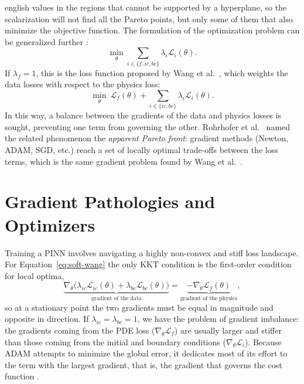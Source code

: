\documentclass[12pt,letterpaper,twoside]{book}
\newcommand{\Loss}{\mathcal{L}}
\begin{document}
\begin{hyphenrules}{english}
values in the regions that cannot be supported by a hyperplane, so the scalarization will not find all
the Pareto points, but only some of them that also minimize the objective function. The formulation of
the optimization problem can be generalized further \cite{rohrhofer2023}:
\begin{equation}
  \min_{\theta}\sum_{i\in\{f,ic,bc\}}\lambda_i\Loss_i(\theta).
  \label{eq:soft-general}
\end{equation}
If $\lambda_f=1$, this is the loss function proposed by Wang et al.~\cite{wang2021gradient}, which weights the
data losses with respect to the physics loss:
\begin{equation}
  \min_{\theta}\ \Loss_f(\theta)+\sum_{i\in\{ic,bc\}}\lambda_i\Loss_i(\theta).
  \label{eq:soft-wang}
\end{equation}
In this way, a balance between the gradients of the data and physics losses is sought, preventing one
term from governing the other. Rohrhofer et al.~\cite{rohrhofer2023} named the related phenomenon the \emph{apparent
Pareto front}: gradient methods (Newton, ADAM, SGD, etc.) reach a set of locally optimal trade-offs
between the loss terms, which is the same gradient problem found by Wang et al.~\cite{wang2021gradient}.

\section{Gradient Pathologies and Optimizers}\label{sec:gradient-pathologies}

Training a PINN involves navigating a highly non-convex and stiff loss landscape. For
Equation~\eqref{eq:soft-wang} the only KKT condition is the first-order condition for local optima,
\begin{equation}
  \underbrace{\nabla_\theta\big(\lambda_{ic}\Loss_{ic}(\theta)+\lambda_{bc}\Loss_{bc}(\theta)\big)}_{\text{gradient of the data}}
  =\underbrace{-\nabla_\theta\Loss_f(\theta)}_{\text{gradient of the physics}},
  \label{eq:kkt-soft}
\end{equation}
so at a stationary point the two gradients must be equal in magnitude and opposite in direction. If
$\lambda_{ic}=\lambda_{bc}=1$, we have the problem of gradient imbalance: the gradients coming from the
PDE loss ($\nabla_\theta\Loss_f$) are usually larger and stiffer than those coming from the initial and
boundary conditions ($\nabla_\theta\Loss_i$). Because ADAM attempts to minimize the global error, it
dedicates most of its effort to the term with the largest gradient, that is, the gradient that governs
the cost function \cite{wang2021gradient}.


\end{hyphenrules}
\end{document}
